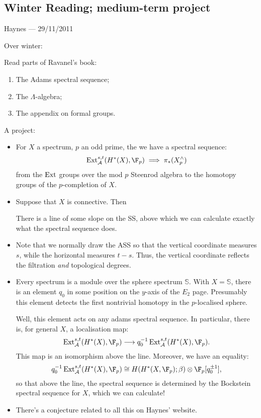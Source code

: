 \documentclass[11pt]{article}
\newcommand{\CONVERSATION}[3]{
\subsection*{#1}
\begin{flushright}
{\small #2 --- #3}
\end{flushright}
}
\begin{document}
\pagebreak
\CONVERSATION{Winter Reading; medium-term project}{Haynes}{29/11/2011}
Over winter:
\begin{itemise}
\item Read parts of Ravanel's book:
\begin{enumerate}\squishlist
\item The Adams spectral sequence;
\item The $\Lambda$-algebra;
\item The appendix on formal groups.
\end{enumerate}
\item A project:
\begin{itemize}\squishlist
\item For $X$ a spectrum, $p$ an odd prime, the we have a spectral sequence:
\[\Ext^{s,t}_\calA(H^*(X),\F_p)\implies\pi_*(X^\wedge_p)\]
from the $\operatorname{Ext}$ groups over the mod $p$ Steenrod algebra to the homotopy groups of the $p$-completion of $X$.
\item Suppose that $X$ is connective. Then
\begin{thm*}
There is a line of some slope on the SS, above which we can calculate exactly what the spectral sequence does.
\end{thm*}
\item Note that we normally draw the ASS so that the vertical coordinate measures $s$, while the horizontal measures $t-s$. Thus, the vertical coordinate reflects the filtration \emph{and} topological degrees.
\item Every spectrum is a module over the sphere spectrum $\mathbb{S}$. With $X=\mathbb{S}$, there is an element $q_0$ in some position on the $y$-axis of the $E_2$ page. Presumably this element detects the first nontrivial homotopy in the $p$-localised sphere.

Well, this element acts on any adams spectral sequence. In particular, there is, for general $X$, a localisation map:
\[\Ext^{s,t}_\calA(H^*(X),\F_p)\to q_0^{-1}\Ext^{s,t}_\calA(H^*(X),\F_p).\]
This map is an isomorphism above the line. Moreover, we have an equality:
\[q_0^{-1}\Ext^{s,t}_\calA(H^*(X),\F_p)\cong H(H^*(X,\F_p);\beta)\otimes\F_p[q_0^{\pm1}],\]
so that above the line, the spectral sequence is determined by the Bockstein spectral sequence for $X$, which we can calculate!
\item There's a conjecture related to all this on Haynes' website.
\end{itemize}
\end{itemise}
\end{document}
